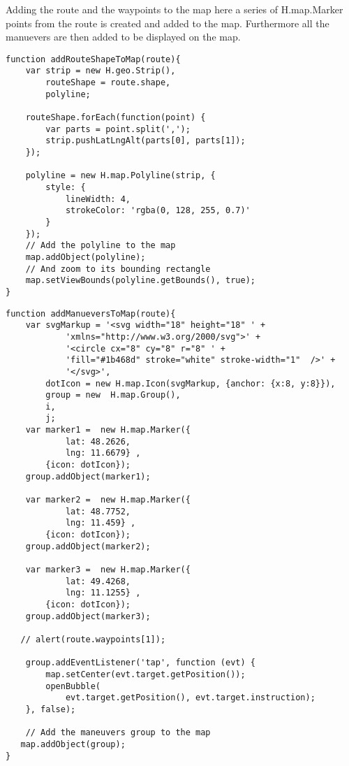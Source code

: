 Adding the route and the waypoints to the map
here a series of H.map.Marker points from the route is created and added to the map. Furthermore all the manuevers are then added to be displayed on the map.

\begin{verbatim}
function addRouteShapeToMap(route){
    var strip = new H.geo.Strip(),
        routeShape = route.shape,
        polyline;

    routeShape.forEach(function(point) {
        var parts = point.split(',');
        strip.pushLatLngAlt(parts[0], parts[1]);
    });

    polyline = new H.map.Polyline(strip, {
        style: {
            lineWidth: 4,
            strokeColor: 'rgba(0, 128, 255, 0.7)'
        }
    });
    // Add the polyline to the map
    map.addObject(polyline);
    // And zoom to its bounding rectangle
    map.setViewBounds(polyline.getBounds(), true);
}
\end{verbatim}


\begin{verbatim}
function addManueversToMap(route){
    var svgMarkup = '<svg width="18" height="18" ' +
            'xmlns="http://www.w3.org/2000/svg">' +
            '<circle cx="8" cy="8" r="8" ' +
            'fill="#1b468d" stroke="white" stroke-width="1"  />' +
            '</svg>',
        dotIcon = new H.map.Icon(svgMarkup, {anchor: {x:8, y:8}}),
        group = new  H.map.Group(),
        i,
        j;
    var marker1 =  new H.map.Marker({
            lat: 48.2626,
            lng: 11.6679} ,
        {icon: dotIcon});
    group.addObject(marker1);

    var marker2 =  new H.map.Marker({
            lat: 48.7752,
            lng: 11.459} ,
        {icon: dotIcon});
    group.addObject(marker2);

    var marker3 =  new H.map.Marker({
            lat: 49.4268,
            lng: 11.1255} ,
        {icon: dotIcon});
    group.addObject(marker3);

   // alert(route.waypoints[1]);

    group.addEventListener('tap', function (evt) {
        map.setCenter(evt.target.getPosition());
        openBubble(
            evt.target.getPosition(), evt.target.instruction);
    }, false);

    // Add the maneuvers group to the map
   map.addObject(group);
}
\end{verbatim}
